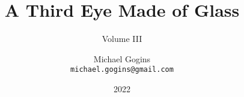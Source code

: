 

\title{A Third Eye Made of Glass}
\subtitle{Volume III}
\author{Michael Gogins \\ \texttt{michael.gogins@gmail.com}}
\date{2022 }
\publishers{Irreducible Productions, New York}

\maketitle
	





